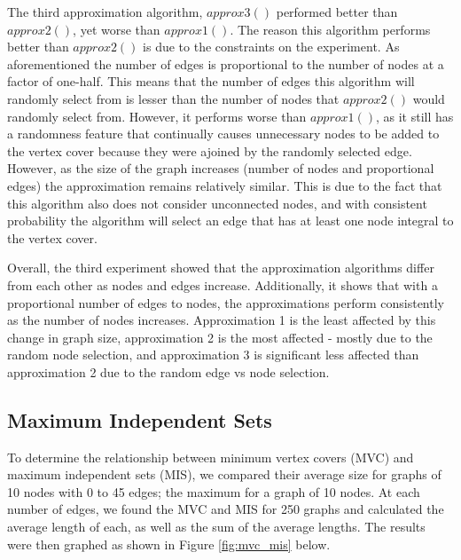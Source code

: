 \documentclass[titlepage]{article}
\begin{document}
The third approximation algorithm, $approx3()$ performed better than $approx2()$, yet worse than $approx1()$. The reason this algorithm performs better than $approx2()$ is due to the constraints on the experiment. As aforementioned the number of edges is proportional to the number of nodes at a factor of one-half. This means that the number of edges this algorithm will randomly select from is lesser than the number of nodes that $approx2()$ would randomly select from. However, it performs worse than $approx1()$, as it still has a randomness feature that continually causes unnecessary nodes to be added to the vertex cover because they were ajoined by the randomly selected edge. However, as the size of the graph increases (number of nodes and proportional edges) the approximation remains relatively similar. This is due to the fact that this algorithm also does not consider unconnected nodes, and with consistent probability the algorithm will select an edge that has at least one node integral to the vertex cover.

Overall, the third experiment showed that the approximation algorithms differ from each other as nodes and edges increase. Additionally, it shows that with a proportional number of edges to nodes, the approximations perform consistently as the number of nodes increases. Approximation 1 is the least affected by this change in graph size, approximation 2 is the most affected - mostly due to the random node selection, and approximation 3 is significant less affected than approximation 2 due to the random edge vs node selection.

\subsection{Maximum Independent Sets}

To determine the relationship between minimum vertex covers (MVC) and maximum independent sets (MIS), we compared their average size for graphs of 10 nodes with 0 to 45 edges; the maximum for a graph of 10 nodes. At each number of edges, we found the MVC and MIS for 250 graphs and calculated the average length of each, as well as the sum of the average lengths. The results were then graphed as shown in Figure \ref{fig:mvc_mis} below.
\end{document}
